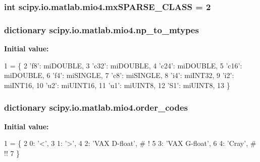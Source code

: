 \subsubsection[{mx\+S\+P\+A\+R\+S\+E\+\_\+\+C\+L\+A\+S\+S}]{\setlength{\rightskip}{0pt plus 5cm}int scipy.\+io.\+matlab.\+mio4.\+mx\+S\+P\+A\+R\+S\+E\+\_\+\+C\+L\+A\+S\+S = 2}\label{namespacescipy_1_1io_1_1matlab_1_1mio4_a9c65d032a83a50d6a9f88b7c3f6bb9fe}
\hypertarget{namespacescipy_1_1io_1_1matlab_1_1mio4_a8559578f5631890f26254654cc7dd485}{}
\subsubsection[{np\+\_\+to\+\_\+mtypes}]{\setlength{\rightskip}{0pt plus 5cm}dictionary scipy.\+io.\+matlab.\+mio4.\+np\+\_\+to\+\_\+mtypes}\label{namespacescipy_1_1io_1_1matlab_1_1mio4_a8559578f5631890f26254654cc7dd485}
{\bfseries Initial value\+:}
\begin{DoxyCode}
1 = \{
2     \textcolor{stringliteral}{'f8'}: miDOUBLE,
3     \textcolor{stringliteral}{'c32'}: miDOUBLE,
4     \textcolor{stringliteral}{'c24'}: miDOUBLE,
5     \textcolor{stringliteral}{'c16'}: miDOUBLE,
6     \textcolor{stringliteral}{'f4'}: miSINGLE,
7     \textcolor{stringliteral}{'c8'}: miSINGLE,
8     \textcolor{stringliteral}{'i4'}: miINT32,
9     \textcolor{stringliteral}{'i2'}: miINT16,
10     \textcolor{stringliteral}{'u2'}: miUINT16,
11     \textcolor{stringliteral}{'u1'}: miUINT8,
12     \textcolor{stringliteral}{'S1'}: miUINT8,
13     \}
\end{DoxyCode}
\hypertarget{namespacescipy_1_1io_1_1matlab_1_1mio4_a591fa20b2c56435d48f6fcfe88d3d2e9}{}
\subsubsection[{order\+\_\+codes}]{\setlength{\rightskip}{0pt plus 5cm}dictionary scipy.\+io.\+matlab.\+mio4.\+order\+\_\+codes}\label{namespacescipy_1_1io_1_1matlab_1_1mio4_a591fa20b2c56435d48f6fcfe88d3d2e9}
{\bfseries Initial value\+:}
\begin{DoxyCode}
1 = \{
2     0: \textcolor{stringliteral}{'<'},
3     1: \textcolor{stringliteral}{'>'},
4     2: \textcolor{stringliteral}{'VAX D-float'},  \textcolor{comment}{# !}
5     3: \textcolor{stringliteral}{'VAX G-float'},
6     4: \textcolor{stringliteral}{'Cray'},  \textcolor{comment}{# !!}
7     \}
\end{DoxyCode}
\hypertarget{namespacescipy_1_1io_1_1matlab_1_1mio4_a5dbd8a10a7ff7916403613f047eee4ba}{}
